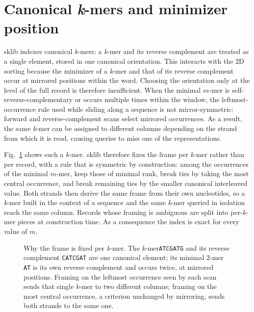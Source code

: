 \documentclass[runningheads,a4paper]{llncs}
\newcommand{\kmer}{\emph{k}-mer\xspace}
\newcommand{\kmers}{\emph{k}-mers\xspace}
\newcommand{\sklib}{\textsf{sklib}\xspace}
\newif\ifrevmarkup\revmarkupfalse
\newcommand{\rev}[1]{\ifrevmarkup\textcolor{blue}{#1}\else#1\fi}
\newenvironment{revblock}{\ifrevmarkup\color{blue}\fi}{}
\begin{document}
\begin{revblock}

\section{Canonical \texorpdfstring{\kmers}{k-mers} and minimizer position}
\label{app:canon}
\sklib{} indexes canonical \kmers: a \kmer and its reverse complement are treated as a single element, stored in one canonical orientation. This interacts with the 2D sorting because the minimizer of a \kmer and that of its reverse complement occur at mirrored positions within the word. Choosing the orientation only at the level of the full record is therefore insufficient. When the minimal $m$-mer is self-reverse-complementary or occurs multiple times within the window, the leftmost-occurrence rule used while sliding along a sequence is not mirror-symmetric: forward and reverse-complement scans select mirrored occurrences. As a result, the same \kmer can be assigned to different columns depending on the strand from which it is read, causing queries to miss one of the representations.

\rev{Fig.~\ref{fig:canonical} shows such a \kmer.} \sklib{} therefore fixes the frame per \kmer rather than per record, with a rule that is symmetric by construction: among the occurrences of the minimal $m$-mer, keep those of minimal rank, break ties by taking the most central occurrence, and break remaining ties by the smaller canonical interleaved value. Both strands then derive the same frame from their own nucleotides, so a \kmer built in the context of a sequence and the same \kmer queried in isolation reach the same column. Records whose framing is ambiguous are split into per-\kmer pieces at construction time. As a consequence the index is exact for every value of $m$.

\begin{figure}[h]
\centering
\resizebox{\textwidth}{!}{}
\caption{\rev{Why the frame is fixed per \kmer. The \kmer \texttt{ATCGATG} and its reverse complement \texttt{CATCGAT} are one canonical element; its minimal $2$-mer \texttt{AT} is its own reverse complement and occurs twice, at mirrored positions. Framing on the leftmost occurrence seen by each scan sends that single \kmer to two different columns; framing on the most central occurrence, a criterion unchanged by mirroring, sends both strands to the same one.}}
\label{fig:canonical}
\end{figure}
\end{revblock}
\end{document}
